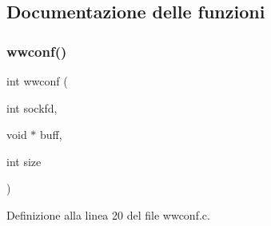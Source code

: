 \subsection{Documentazione delle funzioni}
\mbox{\label{a00062_a0ac2167e23f9cadb1367b63f38e421cc}} 
\subsubsection{\texorpdfstring{wwconf()}{wwconf()}}
{\footnotesize\ttfamily int wwconf (\begin{DoxyParamCaption}\item[{int}]{sockfd,  }\item[{void $\ast$}]{buff,  }\item[{int}]{size }\end{DoxyParamCaption})}



Definizione alla linea 20 del file wwconf.\+c.

